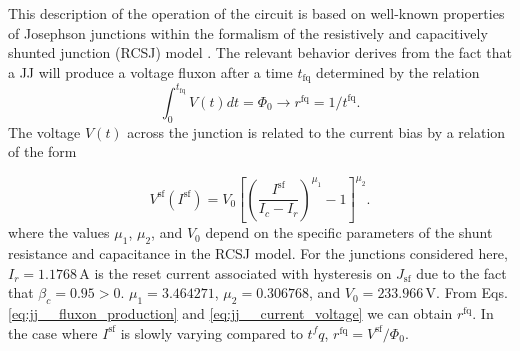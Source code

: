 \documentclass[twocolumn]{article}
\begin{document}
This description of the operation of the circuit is based on well-known properties of Josephson junctions within the formalism of the resistively and capacitively shunted junction (RCSJ) model \cite{vatu1998,ka1999,ti1996}. The relevant behavior derives from the fact that a JJ will produce a voltage fluxon after a time $t_{\mathrm{fq}}$ determined by the relation
\begin{equation}
\label{eq:jj__fluxon_production}
\int_0^{t_{\mathrm{fq}}}V(t)dt = \Phi_0 \rightarrow r^{\mathrm{fq}} = 1/t^{\mathrm{fq}}.
\end{equation}
The voltage $V(t)$ across the junction is related to the current bias by a relation of the form

\begin{equation}
\label{eq:jj__current_voltage}
V^{\mathrm{sf}}(I^{\mathrm{sf}}) = V_0\left[ \left( \frac{I^{\mathrm{sf}}}{I_c-I_r} \right)^{\mu_1} - 1 \right]^{\mu_2}.
\end{equation} 
where the values $\mu_1$, $\mu_2$, and $V_0$ depend on the specific parameters of the shunt resistance and capacitance in the RCSJ model. For the junctions considered here, $I_r = 1.1768$\,\textmu A is the reset current associated with hysteresis on $J_{\mathrm{sf}}$ due to the fact that $\beta_c = 0.95 > 0$. $\mu_1 = 3.464271$, $\mu_2 = 0.306768$, and $V_0 = 233.966$\,\textmu V. From Eqs.\,\ref{eq:jj__fluxon_production} and \ref{eq:jj__current_voltage} we can obtain $r^{\mathrm{fq}}$. In the case where $I^{\mathrm{sf}}$ is slowly varying compared to $t^fq$, $ r^{\mathrm{fq}} = V^{\mathrm{sf}}/\Phi_0$. 

\end{document}
